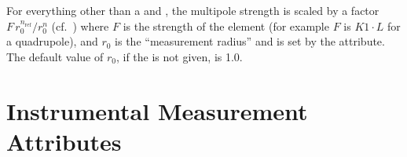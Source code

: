 For everything other than a  and , the
multipole strength is scaled by a factor $F \, r_0^{n_\text{ref}} /
r_0^n$ (cf.~) where $F$ is the strength of the element (for
example $F$ is $K1 \cdot L$ for a quadrupole), and $r_0$ is the
``measurement radius'' and is set by the  attribute. The
default value of $r_0$, if the  is not given, is 1.0.

\section{Instrumental Measurement Attributes}
\label{s:inst.var}


